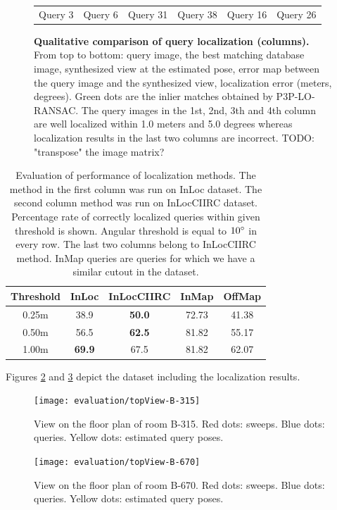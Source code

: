 \documentclass[twoside]{ctuthesis}
\theoremstyle{plain}
\theoremstyle{definition}
\theoremstyle{note}
\begin{document}
{\begin{figure}
{\begin{tabular}{c|c|c|c|c|c}
	Query 3 & 
	Query 6 & 
	Query 31 &
	Query 38 & 
	Query 16 & 
	Query 26 \\
    \end{tabular}
    \caption{{\bf Qualitative comparison of query localization (columns).} From top to bottom: query image, the best matching database image, synthesized view at the estimated pose, error map between the query image and the synthesized view, localization error (meters, degrees). Green dots are the inlier matches obtained by P3P-LO-RANSAC. The query images in the 1st, 2nd, 3th and 4th column are well localized within 1.0 meters and 5.0 degrees whereas localization results in the last two columns are incorrect. TODO: "transpose" the image matrix?
    \label{fig:queryPipeline}}
    }
\end{figure}
}

\begin{table}
	\centering
	\begin{tabular}{|c|c||c|c|c|}
		\hline
		Threshold & InLoc & \bfseries InLocCIIRC & InMap & OffMap \\
		\hline
		0.25m & 38.9 & \bfseries 50.0 & 72.73 & 41.38 \\
		0.50m & 56.5 & \bfseries 62.5 & 81.82 & 55.17 \\
		1.00m & \bfseries 69.9 & 67.5 & 81.82 & 62.07 \\
		\hline
	\end{tabular}
	\caption{Evaluation of performance of localization methods. The method in the first column was run on InLoc dataset. The second column method was run on InLocCIIRC dataset. Percentage rate of correctly localized queries within given threshold is shown. Angular threshold is equal to $10\degree$ in every row. The last two columns belong to InLocCIIRC method. InMap queries are queries for which we have a similar cutout in the dataset.}
	\label{tab:estimation-performance}
\end{table}

Figures \ref{fig:topView-B-315} and \ref{fig:topView-B-670} depict the dataset including the localization results.

\begin{figure}
	\centering
 	\texttt{[image: evaluation/topView-B-315]}
 	\caption{View on the floor plan of room B-315. Red dots: sweeps. Blue dots: queries. Yellow dots: estimated query poses.}
 	\label{fig:topView-B-315}
\end{figure} 

\begin{figure}
	\centering
 	\texttt{[image: evaluation/topView-B-670]}
 	\caption{View on the floor plan of room B-670. Red dots: sweeps. Blue dots: queries. Yellow dots: estimated query poses.}
 	\label{fig:topView-B-670}
\end{figure} 

\appendix

\printindex

\appendix

%



\end{document}

